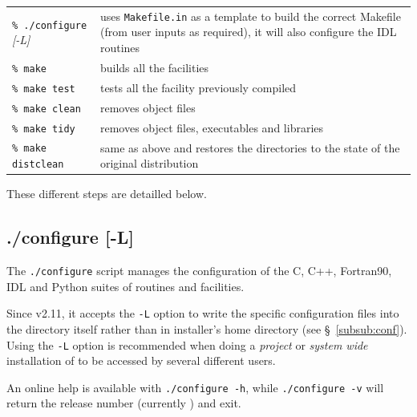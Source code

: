 \documentclass[12pt,twoside]{article}
\begin{document}
\begin{flushright}
\begin{tabular}{p{0.3\hsize} p{0.60\hsize}}
{\tt \% ./configure} {\em [-L]}    & uses {\tt Makefile.in} as a template to build 
                         the correct Makefile (from user inputs as required), it
                         will also configure the IDL routines\\
{\tt \% make}           & builds all the facilities \\
{\tt \% make test}      & tests all the facility previously compiled \\
{\tt \% make clean}     & removes object files \\
{\tt \% make tidy}      & removes object files, executables and libraries \\
{\tt \% make distclean} & same as above and restores the directories to the state of the 
                          original distribution \\
\end{tabular}
\end{flushright}
These different steps are detailled below.

\subsection{./configure [-L]}

The {\tt ./configure} script manages the configuration of the C, C++,
Fortran90, IDL and Python suites of routines and facilities.

Since v2.11, it accepts the {\tt -L} option to write the \healpix specific configuration files
into the \healpix directory itself rather than in installer's home directory (see
\S~\ref{subsub:conf}).
Using the {\tt -L} option is recommended when doing a {\em project} or {\em system wide} installation of
\healpix to be accessed by several different users.

An online help is available with 
{\tt ./configure~-h}, while 
{\tt ./configure~-v} 
will return the \healpix release number (currently \hpxversion) and exit.
\end{document}
